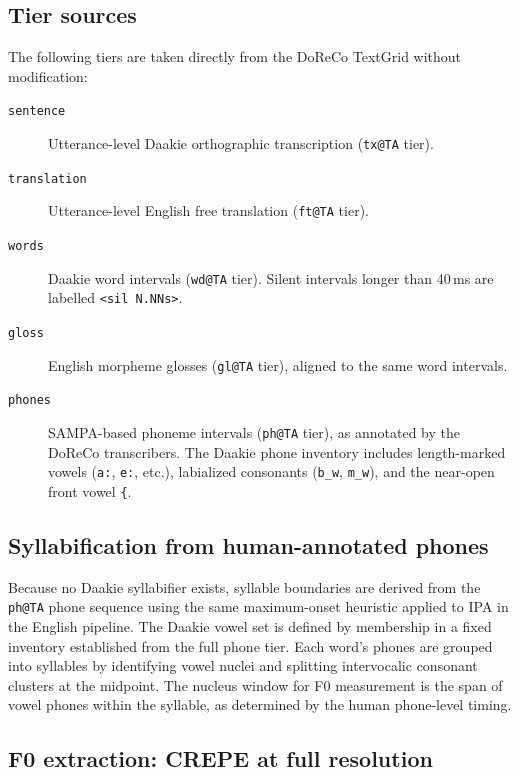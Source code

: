 \subsection{Tier sources}

The following tiers are taken directly from the DoReCo TextGrid without
modification:

\begin{description}
  \item[\texttt{sentence}] Utterance-level Daakie orthographic transcription
        (\texttt{tx@TA} tier).
  \item[\texttt{translation}] Utterance-level English free translation
        (\texttt{ft@TA} tier).
  \item[\texttt{words}] Daakie word intervals (\texttt{wd@TA} tier). Silent
        intervals longer than 40\,ms are labelled \texttt{<sil N.NNs>}.
  \item[\texttt{gloss}] English morpheme glosses (\texttt{gl@TA} tier),
        aligned to the same word intervals.
  \item[\texttt{phones}] SAMPA-based phoneme intervals (\texttt{ph@TA} tier),
        as annotated by the DoReCo transcribers. The Daakie phone inventory
        includes length-marked vowels (\texttt{a:}, \texttt{e:}, etc.),
        labialized consonants (\texttt{b\_w}, \texttt{m\_w}), and the
        near-open front vowel \texttt{\{}.
\end{description}

\subsection{Syllabification from human-annotated phones}

Because no Daakie syllabifier exists, syllable boundaries are derived from the
\texttt{ph@TA} phone sequence using the same maximum-onset heuristic applied to
IPA in the English pipeline. The Daakie vowel set is defined by membership in a
fixed inventory established from the full phone tier. Each word's phones are
grouped into syllables by identifying vowel nuclei and splitting intervocalic
consonant clusters at the midpoint. The nucleus window for F0 measurement is the
span of vowel phones within the syllable, as determined by the human phone-level
timing.

\subsection{F0 extraction: CREPE at full resolution}

